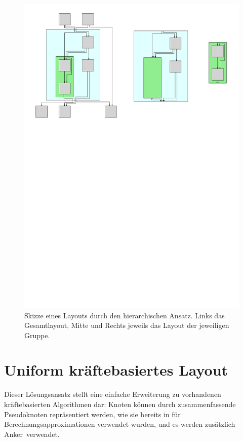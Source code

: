 \begin{figure}[h!]
\begin{center}
	\includegraphics[width=\textwidth]{Pics/hierarchisch.pdf}
	\caption{Skizze eines Layouts durch den hierarchischen Ansatz. Links das Gesamtlayout, Mitte und Rechts jeweils das Layout der jeweiligen Gruppe.}
	\label{Hierarch-Skizze}
\end{center}
\end{figure}

\section{Uniform kräftebasiertes Layout}
\label{UniformK-Ansatz}
Dieser Lösungsansatz stellt eine einfache Erweiterung zu vorhandenen kräftebasierten Algorithmen dar: Knoten können durch zusammenfassende Pseudoknoten repräsentiert werden, wie sie bereits in \cite{gdea_3362} für Berechnungsapproximationen verwendet wurden, und es werden zusätzlich \glqq Anker\grqq\ verwendet.

